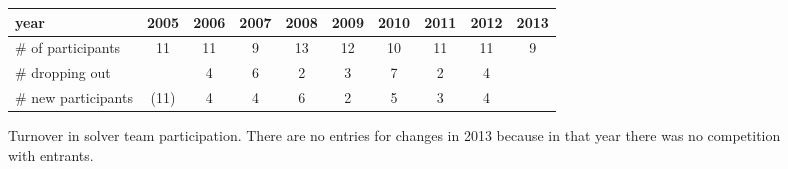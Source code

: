 \documentclass[smallcondensed]{svjour3}
\begin{document}
\begin{figure}
\centering
\begin{tabular}{|l|ccccccccc|}
\hline
year                & 2005 & 2006 & 2007 & 2008 & 2009 & 2010 & 2011 & 2012 & 2013 \\ \hline
\# of participants  & 11   & 11   & 9    & 13   & 12   & 10   & 11   & 11   & 9   \\ \hline
\# dropping out     &      &  4   & 6    &  2   &  3   &  7   &  2   &  4   & \\ \hline
\# new participants & (11) &  4   & 4    &  6   &  2   &  5   &  3   &  4   &      \\ \hline
\end{tabular}
\caption{Turnover in solver team participation. There are no entries for changes in 2013 because in that year there was no competition with entrants.}
\label{Fig:participation}
\end{figure}
\end{document}
